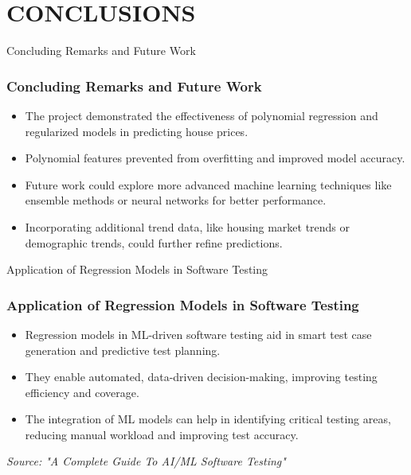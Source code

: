 \section{CONCLUSIONS}
\label{conclusion}


\begin{frame}{Concluding Remarks and Future Work}
    \frametitle{Concluding Remarks and Future Work}
    \begin{itemize}
        \item The project demonstrated the effectiveness of polynomial regression and regularized models in predicting house prices.
        \item Polynomial features prevented from overfitting and improved model accuracy.
        \item Future work could explore more advanced machine learning techniques like ensemble methods or neural networks for better performance.
        \item Incorporating additional trend data, like housing market trends or demographic trends, could further refine predictions.
    \end{itemize}
\end{frame}

\begin{frame}{Application of Regression Models in Software Testing}
    \frametitle{Application of Regression Models in Software Testing}
    \begin{itemize}
        \item Regression models in ML-driven software testing aid in smart test case generation and predictive test planning.
        \item They enable automated, data-driven decision-making, improving testing efficiency and coverage.
        \item The integration of ML models can help in identifying critical testing areas, reducing manual workload and improving test accuracy.
    \end{itemize}
    \vspace{1cm}
    \center
    \tiny
    \textit{Source: "A Complete Guide To AI/ML Software Testing" \cite{katalon_ai_ml_testing}}
\end{frame}

